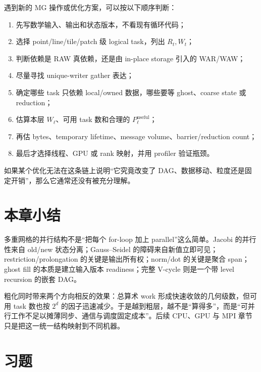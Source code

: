 遇到新的 MG 操作或优化方案，可以按以下顺序判断：

\begin{enumerate}
\item 先写数学输入、输出和状态版本，不看现有循环代码；
\item 选择 point/line/tile/patch 级 logical task，列出 $R_t,W_t$；
\item 判断依赖是 RAW 真依赖，还是由 in-place storage 引入的 WAR/WAW；
\item 尽量寻找 unique-writer gather 表达；
\item 确定哪些 task 只依赖 local/owned 数据，哪些要等 ghost、coarse state 或 reduction；
\item 估算本层 $W_\ell$、可用 task 数和合理的 $P_\ell^{\mathrm{useful}}$；
\item 再估 bytes、temporary lifetime、message volume、barrier/reduction count；
\item 最后才选择线程、GPU 或 rank 映射，并用 profiler 验证瓶颈。
\end{enumerate}

如果某个优化无法在这条链上说明“它究竟改变了 DAG、数据移动、粒度还是固定开销”，那么它通常还没有被充分理解。

\section{本章小结}

多重网格的并行结构不是“把每个 for-loop 加上 parallel”这么简单。Jacobi 的并行性来自 old/new 状态分离；Gauss--Seidel 的障碍来自新值立即可见；restriction/prolongation 的关键是输出所有权；norm/dot 的关键是聚合 span；ghost fill 的本质是建立输入版本 readiness；完整 V-cycle 则是一个带 level recursion 的嵌套 DAG。

粗化同时带来两个方向相反的效果：总算术 work 形成快速收敛的几何级数，但可用 task 数也按 $2^d$ 的因子迅速减少。于是越到粗层，越不是“算得多”，而是“可并行工作不足以摊薄同步、通信与调度固定成本”。后续 CPU、GPU 与 MPI 章节只是把这一统一结构映射到不同机器。

\section*{习题}

